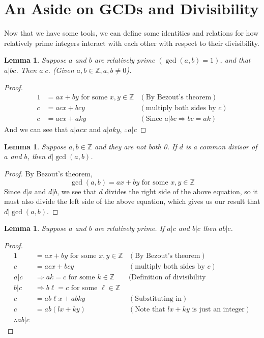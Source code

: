 \documentclass[10pt]{article}
\newcommand{\Z}{\mathbb{Z}}
\newtheorem{lemma}[theorem]{Lemma}
\theoremstyle{definition}
\theoremstyle{remark}
\def\Z{\mathbb{ Z}}
\def\ra{\Rightarrow}
\begin{document}
\section{An Aside on GCDs and Divisibility}
Now that we have some tools, we can define some identities and relations for how relatively prime integers interact with each other with respect to their divisibility.
\begin{lemma}
Suppose $a$ and $b$ are relatively prime $(\gcd(a,b)=1)$, and that $a|bc$.  Then $a|c$.  (Given $a,b \in \Z, a,b \neq 0$).
\end{lemma}
\begin{proof}
\begin{align*}
1 &= ax + by \text{  for some $x,y \in \Z$} &(\text{By Bezout's theorem})\\
c &= acx + bcy &(\text{multiply both sides by $c$})\\
c &= acx + aky &(\text{Since $a|bc \ra bc = ak$})
\end{align*}
And we can see that $a|acx$ and $a|aky$, $\therefore a|c$
\end{proof}

\begin{lemma}
Suppose $a,b \in \Z$ and they are not both 0.  If $d$ is a common divisor of $a$ and $b$, then $d|\gcd(a,b)$.
\end{lemma}
\begin{proof}
By Bezout's theorem, $$\gcd(a,b) = ax + by \text{ for some $x,y \in \Z$}$$
Since $d|a$ and $d|b$, we see that $d$ divides the right side of the above equation, so it must also divide the left side of the above equation, which gives us our result that $d|\gcd(a,b)$.
\end{proof}
\pagebreak
\begin{lemma}
Suppose $a$ and $b$ are relatively prime.  If $a|c$ and $b|c$ then $ab|c$.
\end{lemma}
\begin{proof}
\begin{align*}
1 &= ax + by \text{  for some $x,y \in \Z$} &(\text{By Bezout's theorem})\\
c &= acx + bcy &(\text{multiply both sides by $c$})\\
a|c &\ra ak = c \text{ for some } k \in \Z &(\text{Definition of divisibility}\\
b|c &\ra b\ell = c \text{ for some } \ell \in \Z\\
c &= ab\ell x + abky &(\text{Substituting in})\\
c &= ab(lx + ky) &(\text{Note that $lx + ky$ is just an integer})\\
\therefore ab|c
\end{align*}
\end{proof}
\end{document}
